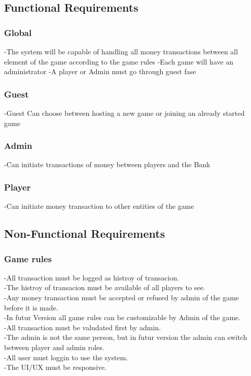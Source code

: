 \documentclass{article}
\begin{document}
\cleardoublepage
\subsection{Functional Requirements}
\subsubsection{Global}
-The system will be capable of handling all money transactions between all element of the game according to the game rules
-Each game will have an administrator
-A player or Admin must go through guest fase
\subsubsection{Guest}
-Guest Can choose between hosting a new game or joining an already started game
\subsubsection{Admin}
-Can initiate transactions of money between players and the Bank
\subsubsection{Player}
-Can initiate money transaction to other entities of the game

\cleardoublepage
\subsection{Non-Functional Requirements}
\subsubsection{Game rules}
-All transaction must be logged as histroy of transacion.\\
-The histroy of transacion must be available of all players to see.\\
-Any money transaction must be accepted or refused by admin of the game before it is made.\\
-In futur Version all game rules can be customizable by Admin of the game.\\
-All transaction must be valudated first by admin.\\
-The admin is not the same person, but in futur version the admin can switch between player and admin roles.\\
-All user must loggin to use the system.\\
-The UI/UX must be responsive.\\
\end{document}

